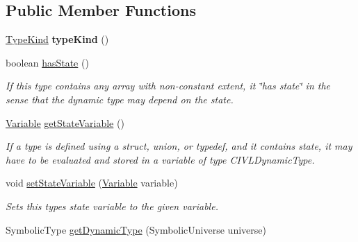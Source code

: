 \subsection*{Public Member Functions}
\begin{DoxyCompactItemize}
\item 
\hypertarget{interfaceedu_1_1udel_1_1cis_1_1vsl_1_1civl_1_1model_1_1IF_1_1type_1_1CIVLType_a72e3842ef519960df7d0a0758fe5a07c}{}\hyperlink{enumedu_1_1udel_1_1cis_1_1vsl_1_1civl_1_1model_1_1IF_1_1type_1_1CIVLType_1_1TypeKind}{Type\+Kind} {\bfseries type\+Kind} ()\label{interfaceedu_1_1udel_1_1cis_1_1vsl_1_1civl_1_1model_1_1IF_1_1type_1_1CIVLType_a72e3842ef519960df7d0a0758fe5a07c}

\item 
boolean \hyperlink{interfaceedu_1_1udel_1_1cis_1_1vsl_1_1civl_1_1model_1_1IF_1_1type_1_1CIVLType_ad06e630b2a547346d274f8b21b36eebb}{has\+State} ()
\begin{DoxyCompactList}\small\item\em If this type contains any array with non-\/constant extent, it \char`\"{}has state\char`\"{} in the sense that the dynamic type may depend on the state. \end{DoxyCompactList}\item 
\hyperlink{interfaceedu_1_1udel_1_1cis_1_1vsl_1_1civl_1_1model_1_1IF_1_1variable_1_1Variable}{Variable} \hyperlink{interfaceedu_1_1udel_1_1cis_1_1vsl_1_1civl_1_1model_1_1IF_1_1type_1_1CIVLType_a49773314fa7c2919346315b64525e86d}{get\+State\+Variable} ()
\begin{DoxyCompactList}\small\item\em If a type is defined using a struct, union, or typedef, and it contains state, it may have to be evaluated and stored in a variable of type C\+I\+V\+L\+Dynamic\+Type. \end{DoxyCompactList}\item 
void \hyperlink{interfaceedu_1_1udel_1_1cis_1_1vsl_1_1civl_1_1model_1_1IF_1_1type_1_1CIVLType_a19c0d27e2f4daf676a82a20727f2cd55}{set\+State\+Variable} (\hyperlink{interfaceedu_1_1udel_1_1cis_1_1vsl_1_1civl_1_1model_1_1IF_1_1variable_1_1Variable}{Variable} variable)
\begin{DoxyCompactList}\small\item\em Sets this type\textquotesingle{}s state variable to the given variable. \end{DoxyCompactList}\item 
Symbolic\+Type \hyperlink{interfaceedu_1_1udel_1_1cis_1_1vsl_1_1civl_1_1model_1_1IF_1_1type_1_1CIVLType_a3f01f0f60e869508ee46927aa5012b22}{get\+Dynamic\+Type} (Symbolic\+Universe universe)

\end{DoxyCompactItemize}
